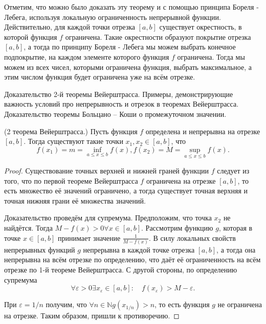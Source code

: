 Отметим, что можно было доказать эту теорему и с помощью принципа Бореля - Лебега, используя локальную ограниченность непрерывной функции. Действительно, для каждой точки отрезка $[a, b]$ существует окрестность, в которой функция $f$ ограничена. Такие окрестности образуют покрытие отрезка $[a, b]$, а тогда по принципу Бореля - Лебега мы можем выбрать конечное подпокрытие, на каждом элементе которого функция $f$ ограничена. Тогда мы можем из всех чисел, которыми ограничена функция, выбрать максимальное, а этим числом функция будет ограничена уже на всём отрезке.

\newpage
\begin{problem}
Доказательство 2-й теоремы Вейерштрасса. Примеры, демонстрирующие важность условий про непрерывность и отрезок в теоремах Вейерштрасса. Доказательство теоремы
Больцано – Коши о промежуточном значении.
\end{problem}
\begin{theorem}
    (2 теорема Вейерштрасса.) Пусть функция $f$ определена и непрерывна
    на отрезке $[a, b]$. Тогда существуют такие точки $x_1, x_2 \in[a, b]$, что
    $$
        f\left(x_1\right)=m=\inf _{a \leq x \leq b} f(x), f\left(x_2\right)=M=\sup _{a \leq x \leq b} f(x) .
    $$
\end{theorem}

\begin{proof}
    Существование точных верхней и нижней граней функции $f$ следует из того, что по первой теореме Вейерштрасса $f$ ограничена на отрезке $[a, b]$, то есть множество её значений ограничено, а тогда существует точная верхняя и точная нижняя грани её множества значений.

    Доказательство проведём для супремума. Предположим, что точка $x_2$ не найдётся. Тогда $M-f(x)>0 \forall x \in[a, b]$. Рассмотрим функцию $g$, которая в точке $x \in[a, b]$ принимает значение $\frac{1}{M-f(x)}$. В силу локальных свойств непрерывных функций $g$ непрерывна в каждой точке отрезка $[a, b]$, а тогда она непрерывна на всём отрезке по определению, что даёт её ограниченность на всём отрезке по 1-й теореме Вейерштрасса. С другой стороны, по определению супремума
    $$
        \forall \varepsilon>0 \exists x_{\varepsilon} \in[a, b]: \quad f\left(x_{\varepsilon}\right)>M-\varepsilon .
    $$

    При $\varepsilon=1 / n$ получим, что $\forall n \in \mathbb{N} g\left(x_{1 / n}\right)>n$, то есть функция $g$ не ограничена на отрезке. Таким образом, пришли к противоречию.
\end{proof}

